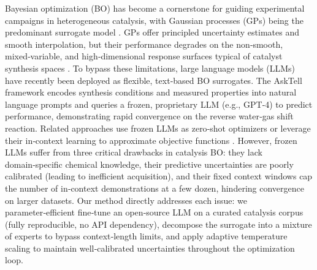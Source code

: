 \documentclass{article}
\begin{document}
Bayesian optimization (BO) has become a cornerstone for guiding experimental campaigns in heterogeneous catalysis, with Gaussian processes (GPs) being the predominant surrogate model \cite{rasmussen2006gaussian, shields2021bayesian}. GPs offer principled uncertainty estimates and smooth interpolation, but their performance degrades on the non‑smooth, mixed‑variable, and high‑dimensional response surfaces typical of catalyst synthesis spaces \cite{zhang2022molbo, lam2020bayesian}. To bypass these limitations, large language models (LLMs) have recently been deployed as flexible, text‑based BO surrogates. The AskTell framework \cite{ramos2023asktell} encodes synthesis conditions and measured properties into natural language prompts and queries a frozen, proprietary LLM (e.g., GPT‑4) to predict performance, demonstrating rapid convergence on the reverse water‑gas shift reaction. Related approaches use frozen LLMs as zero‑shot optimizers \cite{madaan2023llmbo} or leverage their in‑context learning to approximate objective functions \cite{huang2024llmsurrogate}. However, frozen LLMs suffer from three critical drawbacks in catalysis BO: they lack domain‑specific chemical knowledge, their predictive uncertainties are poorly calibrated (leading to inefficient acquisition), and their fixed context windows cap the number of in‑context demonstrations at a few dozen, hindering convergence on larger datasets. Our method directly addresses each issue: we parameter‑efficient fine‑tune an open‑source LLM on a curated catalysis corpus (fully reproducible, no API dependency), decompose the surrogate into a mixture of experts to bypass context‑length limits, and apply adaptive temperature scaling to maintain well‑calibrated uncertainties throughout the optimization loop.
\end{document}
